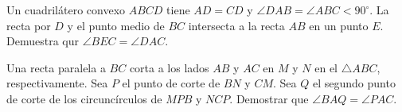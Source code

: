 \begin{section-problem}
    Un cuadrilátero convexo $ABCD$ tiene $AD = CD$ y $\angle DAB = \angle ABC < 90^\circ$.
    La recta por $D$ y el punto medio de $BC$ intersecta a la recta $AB$ en un punto $E$.
    Demuestra qur $\angle BEC = \angle DAC$.
\end{section-problem}

\begin{section-problem}
    Una recta paralela a $BC$ corta a los lados $AB$ y $AC$ en $M$ y $N$ en el $\triangle ABC$, respectivamente.
    Sea $P$ el punto de corte de $BN$ y $CM$.
    Sea $Q$ el segundo punto de corte de los circuncírculos de $MPB$ y $NCP$.
    Demostrar que $\angle BAQ = \angle PAC$.
\end{section-problem}
